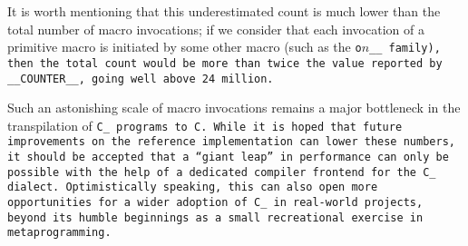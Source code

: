 It is worth mentioning that this underestimated count is much lower than
the total number of macro invocations; if we consider that each invocation
of a primitive macro is initiated by some other macro (such as the
\tt{o}$n$\_\_ family), then the total count would be more than twice
the value reported by \tt{__COUNTER__}, going well above 24 million.

Such an astonishing scale of macro invocations remains a major
bottleneck in the transpilation of \tt{C_} programs to \tt{C}.
While it is hoped that future improvements on the reference
implementation can lower these numbers, it should be accepted
that a ``giant leap'' in performance can only be possible with
the help of a dedicated compiler frontend for the \tt{C\_} dialect.
Optimistically speaking, this can also open more opportunities for
a wider adoption of C\_ in real-world projects, beyond its humble
beginnings as a small recreational exercise in metaprogramming.
